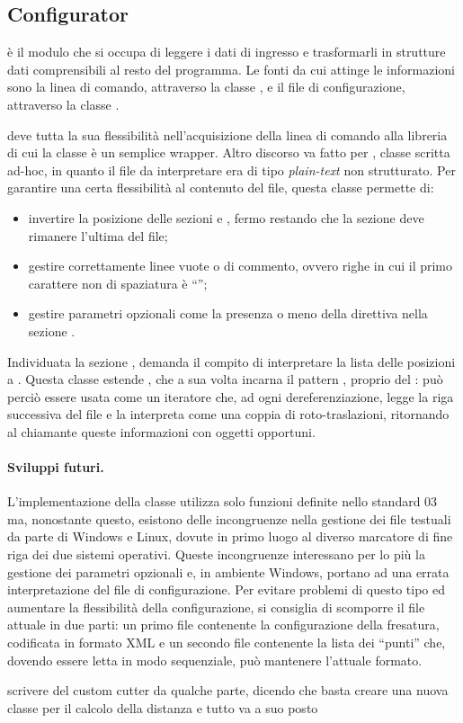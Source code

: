 \subsection{Configurator}
 è il modulo che si occupa di leggere i dati di ingresso e trasformarli in strutture dati comprensibili al resto del programma. Le fonti da cui attinge le informazioni sono la linea di comando, attraverso la classe , e il file di configurazione, attraverso la classe .

 deve tutta la sua flessibilità nell'acquisizione della linea di comando alla libreria \boost {} di cui la classe è un semplice wrapper. Altro discorso va fatto per , classe scritta ad-hoc, in quanto il file da interpretare era di tipo \emph{plain-text} non strutturato. Per garantire una certa flessibilità al contenuto del file, questa classe permette di:
\begin{itemize}
	\item invertire la posizione delle sezioni \code{[PRODUCT]} e \code{[TOOL]}, fermo restando che la sezione \code{[POINTS]} deve rimanere l'ultima del file;
	\item gestire correttamente linee vuote o di commento, ovvero righe in cui il primo carattere non di spaziatura è ``\code{#}'';
	\item gestire parametri opzionali come la presenza o meno della direttiva  nella sezione \code{[TOOL]}.
\end{itemize}
Individuata la sezione \code{[POINTS]},  demanda il compito di interpretare la lista delle posizioni a . Questa classe estende , che a sua volta incarna il pattern , proprio del \cpp: può perciò essere usata come un iteratore che, ad ogni dereferenziazione, legge la riga successiva del file e la interpreta come una coppia di roto-traslazioni, ritornando al chiamante queste informazioni con oggetti opportuni.

\paragraph{Sviluppi futuri.}
L'implementazione della classe  utilizza solo funzioni definite nello standard \cpp{}03 ma, nonostante questo, esistono delle incongruenze nella gestione dei file testuali da parte di Windows e Linux, dovute in primo luogo al diverso marcatore di fine riga dei due sistemi operativi. Queste incongruenze interessano per lo più la gestione dei parametri opzionali e, in ambiente Windows, portano ad una errata interpretazione del file di configurazione. Per evitare problemi di questo tipo ed aumentare la flessibilità della configurazione, si consiglia di scomporre il file attuale in due parti: un primo file contenente la configurazione della fresatura, codificata in formato XML e un secondo file contenente la lista dei ``punti'' che, dovendo essere letta in modo sequenziale, può mantenere l'attuale formato.

\begin{LARGE}scrivere del custom cutter da qualche parte, dicendo che basta creare una nuova classe per il calcolo della distanza e tutto va a suo posto\end{LARGE}
